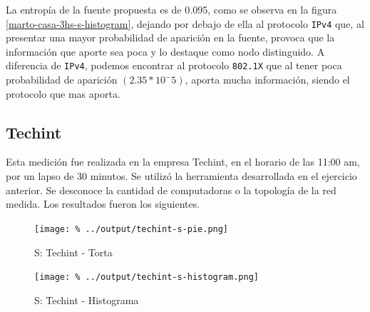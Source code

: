 \documentclass[final,inline,a4paper,narroweqnarray]{ieee}
\begin{document}
    La entropía de la fuente propuesta es de 0.095, como se observa en la
    figura \ref{marto-casa-3hs-s-histogram}, dejando por debajo de ella al
    protocolo \texttt{IPv4} que, al presentar una mayor probabilidad de
    aparición en la fuente, provoca que la información que aporte sea
    poca y lo destaque como nodo distinguido. A diferencia de
    \texttt{IPv4}, podemos encontrar al protocolo \texttt{802.1X} que al
    tener poca probabilidad de aparición $(2.35 * 10^-5)$, aporta mucha
    información, siendo el protocolo que mas aporta.
      
    
    \subsection{Techint}

    Esta medición fue realizada en la empresa Techint, en el horario de
    las 11:00 am, por un lapso de 30 minutos. Se utilizó la herramienta
    desarrollada en el ejercicio anterior. Se desconoce la cantidad de
    computadoras o la topología de la red medida. Los resultados fueron
    los siguientes.
    
    
    \begin{figure}[ht]\begin{center}
      \texttt{[image: \%
      ../output/techint-s-pie.png]}
      \vspace{-3em}
      \caption{S: Techint - Torta}
      \label{techint-s-pie}
    \end{center}\end{figure}
 
     
    \begin{figure}[ht]\begin{center}
      \texttt{[image: \%
      ../output/techint-s-histogram.png]}
      \caption{S: Techint - Histograma}
      \label{techint-s-histogram}
    \end{center}\end{figure}
\end{document}
